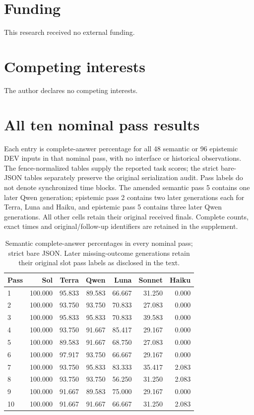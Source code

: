 \documentclass[a4paper,preprint,12pt,numbers,nopreprintline]{elsarticle}
\begin{document}
\section*{Funding}
This research received no external funding.

\section*{Competing interests}
The author declares no competing interests.

\clearpage\appendix
\section{All ten nominal pass results}\label{app:all-rounds}
Each entry is complete-answer percentage for all 48 semantic or 96 epistemic DEV inputs in that nominal pass, with no interface or historical observations. The fence-normalized tables supply the reported task scores; the strict bare-JSON tables separately preserve the original serialization audit. Pass labels do not denote synchronized time blocks. The amended semantic pass 5 contains one later Qwen generation; epistemic pass 2 contains two later generations each for Terra, Luna and Haiku, and epistemic pass 5 contains three later Qwen generations. All other cells retain their original received finals. Complete counts, exact times and original/follow-up identifiers are retained in the supplement.
\begin{table}[htbp]\centering\scriptsize
\caption{Semantic complete-answer percentages in every nominal pass; strict bare JSON. Later missing-outcome generations retain their original slot pass labels as disclosed in the text.}\label{tab:rounds-semantic-primary}
\setlength{\tabcolsep}{3pt}
\begin{tabular}{lrrrrrr}\toprule
Pass & Sol & Terra & Qwen & Luna & Sonnet & Haiku\\\midrule
1 & 100.000 & 95.833 & 89.583 & 66.667 & 31.250 & 0.000\\
2 & 100.000 & 93.750 & 93.750 & 70.833 & 27.083 & 0.000\\
3 & 100.000 & 95.833 & 95.833 & 70.833 & 39.583 & 0.000\\
4 & 100.000 & 93.750 & 91.667 & 85.417 & 29.167 & 0.000\\
5 & 100.000 & 89.583 & 91.667 & 68.750 & 27.083 & 0.000\\
6 & 100.000 & 97.917 & 93.750 & 66.667 & 29.167 & 0.000\\
7 & 100.000 & 93.750 & 95.833 & 83.333 & 35.417 & 2.083\\
8 & 100.000 & 93.750 & 93.750 & 56.250 & 31.250 & 2.083\\
9 & 100.000 & 91.667 & 89.583 & 75.000 & 29.167 & 0.000\\
10 & 100.000 & 91.667 & 91.667 & 66.667 & 31.250 & 2.083\\
\bottomrule\end{tabular}
\end{table}
\end{document}
